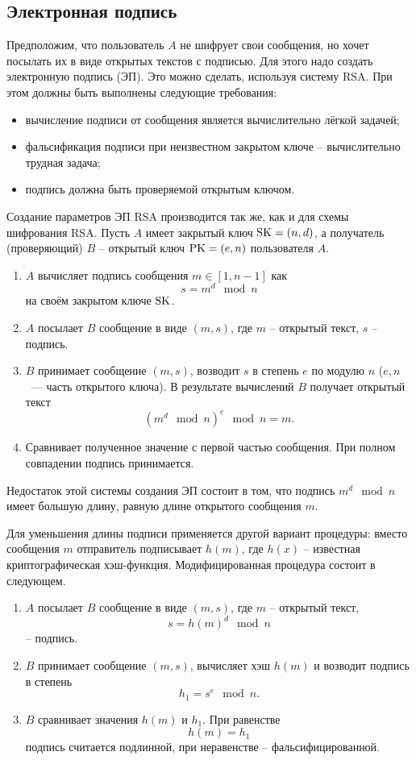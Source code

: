 \subsection{Электронная подпись}

Предположим, что пользователь $A$ не шифрует свои сообщения, но хочет посылать их в виде открытых текстов с подписью. Для этого надо создать электронную подпись (ЭП). Это можно сделать, используя систему RSA. При этом должны быть выполнены следующие требования:
\begin{itemize}
    \item вычисление подписи от сообщения является вычислительно лёгкой задачей;
    \item фальсификация подписи при неизвестном закрытом ключе -- вычислительно трудная задача;
    \item подпись должна быть проверяемой открытым ключом.
\end{itemize}

Создание параметров ЭП RSA производится так же, как и для схемы шифрования RSA. Пусть $A$ имеет закрытый ключ $\textrm{SK} = (n, d)$, а получатель (проверяющий) $B$ -- открытый ключ $\textrm{PK} = (e,n)$ пользователя $A$.

\begin{enumerate}
    \item $A$ вычисляет подпись сообщения $m \in [1,n-1]$ как
        \[ s = m^{d} \mod n \]
        на своём закрытом ключе $\textrm{SK}$.
    \item $A$ посылает $B$ сообщение в виде $(m, s)$, где $m$ -- открытый текст, $s$ -- подпись.
    \item $B$ принимает сообщение $(m, s)$, возводит $s$ в степень $e$ по модулю $n$ ($e, n$ ~--- часть открытого ключа). В результате вычислений $B$ получает открытый текст
        \[ \left( m^{d} \mod n \right)^{e} \mod n = m. \]
    \item Сравнивает полученное значение с первой частью сообщения. При полном совпадении подпись принимается.
\end{enumerate}
Недостаток этой системы создания ЭП состоит в том, что подпись $m^{d} \mod n$ имеет большую длину, равную длине открытого сообщения $m$.

Для уменьшения длины подписи применяется другой вариант процедуры: вместо сообщения $m$ отправитель подписывает $h(m)$, где $h(x)$ -- известная криптографическая хэш-функция. Модифицированная процедура состоит в следующем.

\begin{enumerate}
    \item $A$ посылает $B$ сообщение в виде $(m, s)$, где $m$ -- открытый текст,
        \[ s = h(m)^d \mod n \]
        -- подпись.
    \item $B$ принимает сообщение $(m, s)$, вычисляет хэш $h(m)$ и возводит подпись в степень
        \[ h_1 = s^e \mod n. \]
    \item $B$ сравнивает значения $h(m)$ и $h_1$. При равенстве
        \[ h(m) = h_1 \]
        подпись считается подлинной, при неравенстве -- фальсифицированной.
\end{enumerate}


